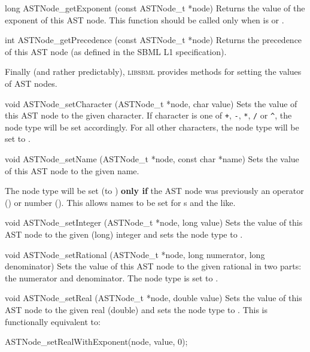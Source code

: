 \documentclass{sbmlmanual}
\newcommand{\libsbml}{\textsc{libsbml}}
\begin{document}
\begin{methoddef}{long ASTNode\_getExponent (const ASTNode\_t *node)}
  Returns the value of the exponent of this AST node.  This function should
  be called only when  is 
  or .
\end{methoddef}


\begin{methoddef}{int ASTNode\_getPrecedence (const ASTNode\_t *node)}
  Returns the precedence of this AST node (as defined in the SBML L1
  specification).
\end{methoddef}


Finally (and rather predictably), \libsbml{} provides methods for setting
the values of AST nodes.


\begin{methoddef}{void ASTNode\_setCharacter (ASTNode\_t *node, char value)}
  Sets the value of this AST node to the given character.  If character is
  one of \verb|+|, \verb|-|, \verb|*|, \verb|/| or \verb|^|, the node type
  will be set accordingly.  For all other characters, the node type will be
  set to .
\end{methoddef}


\begin{methoddef}{void ASTNode\_setName (ASTNode\_t *node, const char *name)}
  Sets the value of this AST node to the given name.
 
  The node type will be set (to ) \textbf{only if} the AST
  node was previously an operator () or
  number ().  This allows names to be set for
  s and the like.
\end{methoddef}


\begin{methoddef}{void ASTNode\_setInteger (ASTNode\_t *node, long value)}
  Sets the value of this AST node to the given (long) integer and sets the
  node type to .
\end{methoddef}


\begin{methoddef}{void ASTNode\_setRational (ASTNode\_t *node, long numerator, long denominator)}
  Sets the value of this AST node to the given rational in two parts:
  the numerator and denominator.  The node type is set to .
\end{methoddef}


\begin{methoddef}{void ASTNode\_setReal (ASTNode\_t *node, double value)}
  Sets the value of this AST node to the given real (double) and sets the
  node type to .  This is functionally equivalent to:
  \begin{example}[c]
    ASTNode_setRealWithExponent(node, value, 0);
  \end{example}
\end{methoddef}
\end{document}
